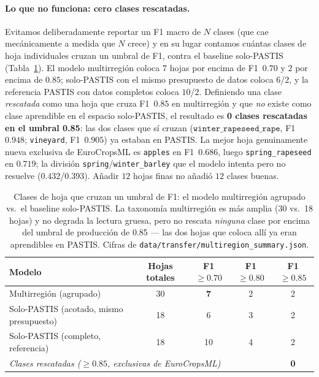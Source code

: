 \paragraph{Lo que no funciona: cero clases rescatadas.}
Evitamos deliberadamente reportar un F1 macro de $N$ clases (que cae
mecánicamente a medida que $N$ crece) y en su lugar contamos cuántas
clases de hoja individuales cruzan un umbral de F1, contra el baseline
solo-PASTIS (Tabla~\ref{tab:multiregion_threshold}). El modelo
multirregión coloca $7$ hojas por encima de F1~$0.70$ y $2$ por encima de
$0.85$; solo-PASTIS con el mismo presupuesto de datos coloca $6$/$2$, y
la referencia PASTIS con datos completos coloca $10$/$2$. Definiendo una
clase \emph{rescatada} como una hoja que cruza F1~$0.85$ en multirregión
y que \emph{no} existe como clase aprendible en el espacio solo-PASTIS,
el resultado es \textbf{0 clases rescatadas en el umbral 0.85}: las dos
clases que sí cruzan ($\texttt{winter\_rapeseed\_rape}$, F1~$0.948$;
\texttt{vineyard}, F1~$0.905$) ya estaban en PASTIS. La mejor hoja
genuinamente nueva exclusiva de EuroCropsML es \texttt{apples} en
F1~$0.686$, luego \texttt{spring\_rapeseed} en $0.719$; la división
\texttt{spring}/\texttt{winter\_barley} que el modelo intenta pero no
resuelve ($0.432$/$0.393$). Añadir $12$ hojas finas no añadió $12$ clases
buenas.

\begin{table}[t]
  \centering
  \caption{Clases de hoja que cruzan un umbral de F1: el modelo
  multirregión agrupado vs.\ el baseline solo-PASTIS. La taxonomía
  multirregión es más amplia (30 vs.\ 18 hojas) y no degrada la lectura
  gruesa, pero no rescata \emph{ninguna} clase por encima del umbral de
  producción de 0.85 --- las dos hojas que coloca allí ya eran aprendibles
  en PASTIS. Cifras de
  \texttt{data/transfer/multiregion\_summary.json}.}
  \label{tab:multiregion_threshold}
  \begin{tabular}{lcccc}
    \toprule
    Modelo & Hojas totales & F1$\ge0.70$ & F1$\ge0.80$ & F1$\ge0.85$ \\
    \midrule
    Multirregión (agrupado)            & 30 & \textbf{7} & 2 & 2 \\
    Solo-PASTIS (acotado, mismo presupuesto) & 18 & 6 & 3 & 2 \\
    Solo-PASTIS (completo, referencia)     & 18 & 10 & 4 & 2 \\
    \midrule
    \multicolumn{4}{l}{\emph{Clases rescatadas ($\ge0.85$, exclusivas de EuroCropsML)}} & \textbf{0} \\
    \bottomrule
  \end{tabular}
\end{table}

